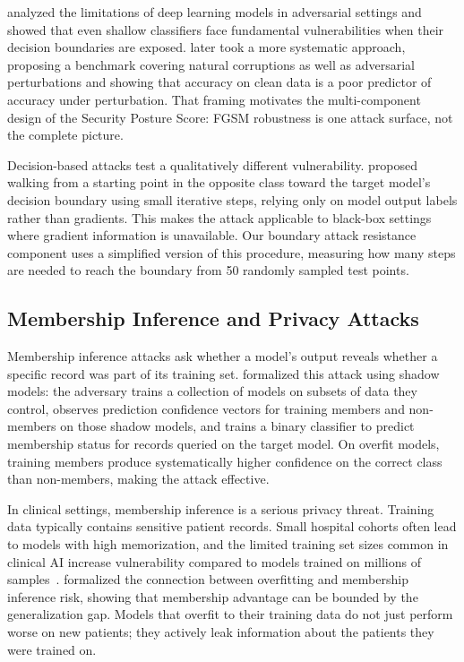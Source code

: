 \documentclass[11pt]{article}
\begin{document}
\citet{papernot2016limitations} analyzed the limitations of deep learning
models in adversarial settings and showed that even shallow classifiers face
fundamental vulnerabilities when their decision boundaries are exposed.
\citet{hendrycks2019benchmarking} later took a more systematic approach,
proposing a benchmark covering natural corruptions as well as adversarial
perturbations and showing that accuracy on clean data is a poor predictor of
accuracy under perturbation. That framing motivates the multi-component design
of the Security Posture Score: FGSM robustness is one attack surface, not
the complete picture.

Decision-based attacks test a qualitatively different vulnerability.
\citet{brendel2018decision} proposed walking from a starting point in the
opposite class toward the target model's decision boundary using small
iterative steps, relying only on model output labels rather than gradients.
This makes the attack applicable to black-box settings where gradient
information is unavailable. Our boundary attack resistance component uses a
simplified version of this procedure, measuring how many steps are needed to
reach the boundary from 50 randomly sampled test points.

\subsection{Membership Inference and Privacy Attacks}

Membership inference attacks ask whether a model's output reveals whether a
specific record was part of its training set.
\citet{shokri2017membership} formalized this attack using shadow models: the
adversary trains a collection of models on subsets of data they control,
observes prediction confidence vectors for training members and non-members on
those shadow models, and trains a binary classifier to predict membership
status for records queried on the target model. On overfit models, training
members produce systematically higher confidence on the correct class than
non-members, making the attack effective.

In clinical settings, membership inference is a serious privacy threat.
Training data typically contains sensitive patient records. Small hospital
cohorts often lead to models with high memorization, and the
limited training set sizes common in clinical AI increase vulnerability
compared to models trained on millions of samples~\citep{yeom2018privacy}.
\citet{yeom2018privacy} formalized the connection between overfitting and
membership inference risk, showing that membership advantage can be bounded
by the generalization gap. Models that overfit to their training data do not
just perform worse on new patients; they actively leak information about the
patients they were trained on.
\end{document}
